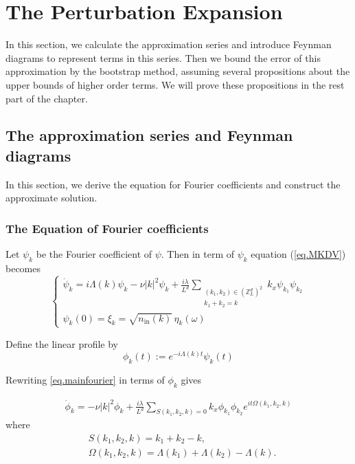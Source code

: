 \section{The Perturbation Expansion}
In this section, we calculate the approximation series and introduce Feynman diagrams to represent terms in this series. Then we bound the error of this approximation by the bootstrap method, assuming several propositions about the upper bounds of higher order terms. We will prove these propositions in the rest part of the chapter.


\subsection{The approximation series and Feynman diagrams}\label{sec.appFey} In this section, we derive the equation for Fourier coefficients and construct the approximate solution. 

\subsubsection{The Equation of Fourier coefficients}

Let $\psi_k$ be the Fourier coefficient of $\psi$. Then in term of $\psi_k$ equation (\ref{eq.MKDV}) becomes
\begin{equation}\label{eq.mainfourier}
\begin{cases}
 \dot{\psi}_{k} =  i\Lambda(k) \psi_k -\nu |k|^2 \psi_k
 +\frac{i\lambda}{L^{d}} \sum\limits_{\substack{(k_1,k_2) \in (\mathbb{Z}^d_L)^2 \\ k_1 + k_2 = k}} k_{x}\psi_{k_1} \psi_{k_2}  \\[2em]
\psi_k(0) = \xi_k = \sqrt{n_{\textrm{in}}(k)} \, \eta_{k}(\omega)
\end{cases}
\end{equation}

Define the linear profile by
\begin{equation}
\phi_k(t):= e^{-i\Lambda(k) t}  \psi_k(t)    
\end{equation}

Rewriting \eqref{eq.mainfourier} in terms of $\phi_k$ gives  

\begin{equation}\label{eq.mainlinearprofile}
\begin{split}
\dot{\phi}_{k} 
= -\nu |k|^2 \phi_k + \frac{i\lambda}{L^{d}} \sum\limits_{S(k_1,k_2,k)=0}k_{x}\phi_{k_1} \phi_{k_2}e^{i t\Omega(k_1,k_2,k)}
\end{split}
\end{equation}
where
\begin{equation}
\begin{split}
    &S(k_1,k_2,k) = k_1 + k_2 - k,
    \\
    &\Omega(k_1,k_2,k) =\Lambda(k_1)+\Lambda(k_2)-\Lambda(k).
\end{split}
\end{equation}

